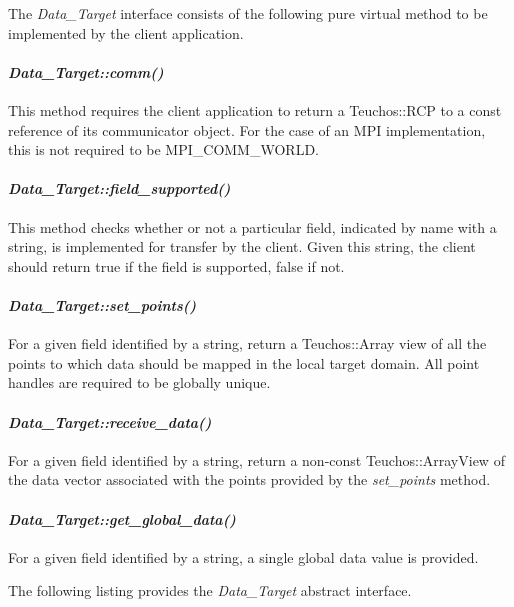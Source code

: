 \documentclass[letterpaper]{article}
\begin{document}
The {\sl Data\_Target} interface consists of the following pure
virtual method to be implemented by the client application.

\paragraph{\sl Data\_Target::comm()}
This method requires the client application to return a Teuchos::RCP
to a const reference of its communicator object. For the case of an
MPI implementation, this is not required to be MPI\_COMM\_WORLD.

\paragraph{\sl Data\_Target::field\_supported()}
This method checks whether or not a particular field, indicated by
name with a string, is implemented for transfer by the client. Given
this string, the client should return true if the field is supported,
false if not.

\paragraph{\sl Data\_Target::set\_points()}
For a given field identified by a string, return a Teuchos::Array view
of all the points to which data should be mapped in the local target
domain. All point handles are required to be globally unique.

\paragraph{\sl Data\_Target::receive\_data()}
For a given field identified by a string, return a non-const
Teuchos::ArrayView of the data vector associated with the points
provided by the {\sl set\_points} method.

\paragraph{\sl Data\_Target::get\_global\_data()}
For a given field identified by a string, a single global data value
is provided.

The following listing provides the {\sl Data\_Target} abstract
interface. 
\end{document}
